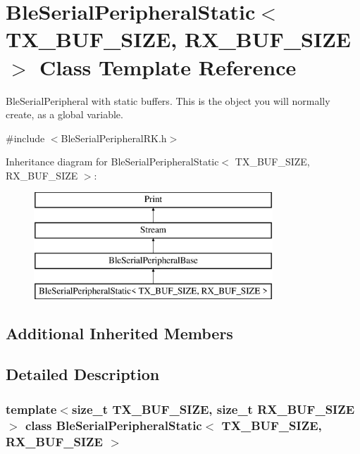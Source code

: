 \hypertarget{class_ble_serial_peripheral_static}{}\section{Ble\+Serial\+Peripheral\+Static$<$ T\+X\+\_\+\+B\+U\+F\+\_\+\+S\+I\+ZE, R\+X\+\_\+\+B\+U\+F\+\_\+\+S\+I\+ZE $>$ Class Template Reference}
\label{class_ble_serial_peripheral_static}


Ble\+Serial\+Peripheral with static buffers. This is the object you will normally create, as a global variable.  




{\ttfamily \#include $<$Ble\+Serial\+Peripheral\+R\+K.\+h$>$}

Inheritance diagram for Ble\+Serial\+Peripheral\+Static$<$ T\+X\+\_\+\+B\+U\+F\+\_\+\+S\+I\+ZE, R\+X\+\_\+\+B\+U\+F\+\_\+\+S\+I\+ZE $>$\+:\begin{figure}[H]
\begin{center}
\leavevmode
\includegraphics[height=4.000000cm]{class_ble_serial_peripheral_static}
\end{center}
\end{figure}
\subsection*{Additional Inherited Members}


\subsection{Detailed Description}
\subsubsection*{template$<$size\+\_\+t T\+X\+\_\+\+B\+U\+F\+\_\+\+S\+I\+ZE, size\+\_\+t R\+X\+\_\+\+B\+U\+F\+\_\+\+S\+I\+ZE$>$\newline
class Ble\+Serial\+Peripheral\+Static$<$ T\+X\+\_\+\+B\+U\+F\+\_\+\+S\+I\+Z\+E, R\+X\+\_\+\+B\+U\+F\+\_\+\+S\+I\+Z\+E $>$}

